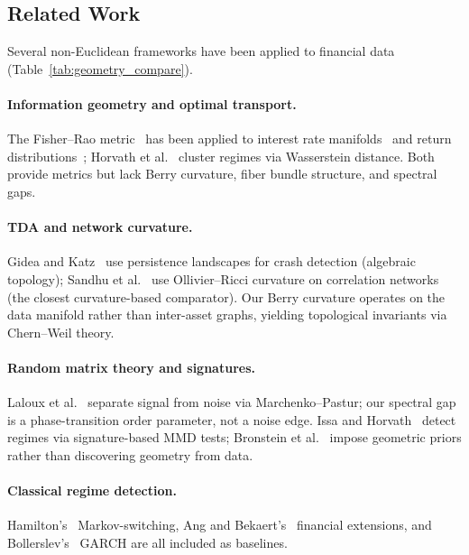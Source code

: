 \documentclass[3p]{elsarticle}
\begin{document}
\subsection{Related Work}\label{subsec:related}

Several non-Euclidean frameworks have been applied to financial data
(Table~\ref{tab:geometry_compare}).

\paragraph{Information geometry and optimal transport.}
The Fisher--Rao metric~\cite{amari_nagaoka2000} has been applied to
interest rate manifolds~\cite{brody_hughston2001} and return
distributions~\cite{taylor2019}; Horvath et al.~\cite{horvath2024}
cluster regimes via Wasserstein distance.  Both provide metrics but
lack Berry curvature, fiber bundle structure, and spectral gaps.

\paragraph{TDA and network curvature.}
Gidea and Katz~\cite{gidea_katz2018} use persistence landscapes for
crash detection (algebraic topology); Sandhu et al.~\cite{sandhu2016}
use Ollivier--Ricci curvature on correlation networks (the closest
curvature-based comparator).  Our Berry curvature operates on the data
manifold rather than inter-asset graphs, yielding topological invariants
via Chern--Weil theory.

\paragraph{Random matrix theory and signatures.}
Laloux et al.~\cite{laloux1999} separate signal from noise via
Marchenko--Pastur; our spectral gap is a phase-transition order
parameter, not a noise edge.  Issa and Horvath~\cite{issa_horvath2023}
detect regimes via signature-based MMD tests; Bronstein et
al.~\cite{bronstein2021} impose geometric priors rather than
discovering geometry from data.

\paragraph{Classical regime detection.}
Hamilton's~\cite{hamilton1989} Markov-switching, Ang and
Bekaert's~\cite{ang_bekaert2002} financial extensions, and
Bollerslev's~\cite{bollerslev1986} GARCH are all included as baselines.
\end{document}
